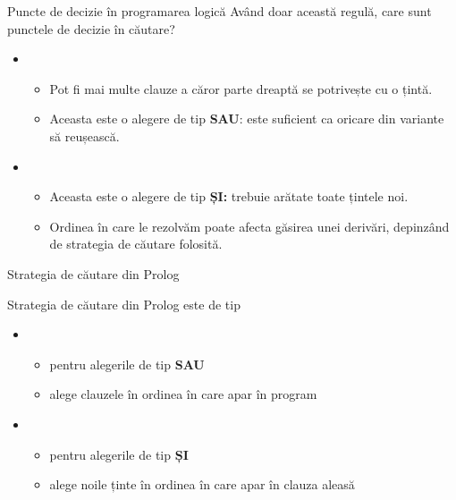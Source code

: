 \documentclass[xcolor=pdftex,romanian,colorlinks]{beamer}
\begin{document}
\begin{frame}{Puncte de decizie în programarea logică}
Având doar această regulă, care sunt punctele de decizie în căutare?
\begin{itemize}
   
  \item {}
  \begin{itemize}
    \item Pot fi mai multe clauze a căror parte dreaptă se potrivește cu o țintă.
    \item Aceasta este o alegere de tip \textbf{SAU}: este suficient ca oricare din variante să reușească.
  \end{itemize}
  
  \medskip  
  \item {}
  \begin{itemize}
    \item Aceasta este o alegere de tip \textbf{ȘI:} trebuie arătate toate țintele noi.
    \item Ordinea în care le rezolvăm poate afecta găsirea unei derivări, depinzând de strategia de căutare folosită.
  \end{itemize}
\end{itemize}
\end{frame}

\begin{frame}{Strategia de căutare din Prolog}

Strategia de căutare din Prolog este de tip 
\medskip
\begin{itemize}
  \item {}
  \begin{itemize}
    \item pentru alegerile de tip \textbf{SAU}
    \item alege clauzele în ordinea în care apar în program
  \end{itemize}
  \medskip
  \item {}
  \begin{itemize}
    \item pentru alegerile de tip \textbf{ȘI}
    \item alege noile ținte în ordinea în care apar în clauza aleasă
  \end{itemize}
\end{itemize}

\end{frame}
\end{document}
